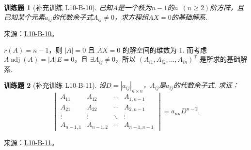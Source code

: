 \documentclass[UTF8,12pt,a4paper,fontset=fandol]{ctexart}
\newtheorem{exercise}{训练题}[section]
\begin{document}
\begin{exercise}[补充训练 L10-B-10]\label{prob:L10-B-10}
已知$A$是一个秩为$n-1$的$n\enspace(n \geqslant 2)$阶方阵，且已知某个元素$a_{ij}$的代数余子式$A_{ij} \neq 0$，求方程组$AX=0$的基础解系.
\end{exercise}
\noindent 来源：\href{https://github.com/yhwu-is/Linear-Algebra-Left-Undone/blob/new/%E8%AE%B2%E4%B9%89/%E4%B8%93%E9%A2%98/10%20%E8%A1%8C%E5%88%97%E5%BC%8F.tex}{L10-B-10}。
\begin{solve}
$r(A) = n-1$，则 $\lvert A \rvert = 0$ 且 $AX = 0$ 的解空间的维数为 1. 而考虑 $A\operatorname{adj}(A) = \lvert A \rvert E = 0$，且 $\exists A_{ij} \neq 0$，所以 $(A_{i1}, A_{i2}, \ldots , A_{in})^{\mathrm{T}}$ 是所求的基础解系.
\end{solve}

\begin{exercise}[补充训练 L10-B-11]\label{prob:L10-B-11}
设$D=|a_{ij}|_{n \times n}$，$A_{ij}$是$a_{ij}$的代数余子式. 求证：
        \[\begin{vmatrix}
                A_{11}    & A_{12}    & \cdots & A_{1,n-1}   \\
                A_{21}    & A_{22}    & \cdots & A_{2,n-1}   \\
                \vdots    & \vdots    & \ddots & \vdots      \\
                A_{n-1,1} & A_{n-1,2} & \cdots & A_{n-1,n-1}
            \end{vmatrix}=a_{nn}D^{n-2}.\]
\end{exercise}
\noindent 来源：\href{https://github.com/yhwu-is/Linear-Algebra-Left-Undone/blob/new/%E8%AE%B2%E4%B9%89/%E4%B8%93%E9%A2%98/10%20%E8%A1%8C%E5%88%97%E5%BC%8F.tex}{L10-B-11}。
\end{document}
